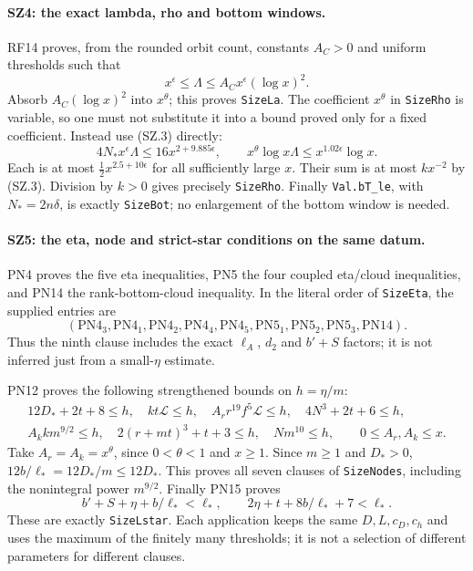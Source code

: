 \documentclass[11pt,a4paper]{article}
\numberwithin{equation}{section}
\theoremstyle{remark}\newtheorem{remark}[theorem]{Remark}
\begin{document}
\paragraph{SZ4: the exact lambda, rho and bottom windows.}
RF14 proves, from the rounded orbit count, constants $A_C>0$ and
uniform thresholds such that
\[
        x^\epsilon\leq\Lambda
                    \leq A_Cx^\epsilon(\log x)^2.
\]
Absorb $A_C(\log x)^2$ into $x^\theta$; this proves
\texttt{SizeLa}. The coefficient $x^\theta$ in
\texttt{SizeRho} is variable, so one must not substitute it into a
bound proved only for a fixed coefficient. Instead use (SZ.3) directly:
\[
 4N_*x^\epsilon\Lambda
       \leq16x^{2+9.885\epsilon},\qquad
 x^\theta\log x\Lambda
       \leq x^{1.02\epsilon}\log x.                            \tag{SZ.9}
\]
Each is at most $\frac12x^{2.5+10\epsilon}$ for all sufficiently
large $x$. Their sum is at most $k x^{-2}$ by (SZ.3).
Division by $k>0$ gives precisely \texttt{SizeRho}.
Finally \texttt{Val.bT\_\allowbreak le}, with $N_*=2n\delta$, is exactly
\texttt{SizeBot}; no enlargement of the bottom window is needed.

\paragraph{SZ5: the eta, node and strict-star conditions on the same datum.}
PN4 proves the five eta inequalities, PN5 the four coupled eta/cloud
inequalities, and PN14 the rank-bottom-cloud inequality. In the
literal order of \texttt{SizeEta}, the supplied entries are
\[
 (\mathrm{PN4}_3,\mathrm{PN4}_1,\mathrm{PN4}_2,
   \mathrm{PN4}_4,\mathrm{PN4}_5,
   \mathrm{PN5}_1,\mathrm{PN5}_2,\mathrm{PN5}_3,\mathrm{PN14}).
                                                                    \tag{SZ.10}
\]
Thus the ninth clause includes the exact $\ell_A$, $d_2$ and
$b'+S$ factors; it is not inferred just from a small-$\eta$ estimate.

PN12 proves the following strengthened bounds on $h=\eta/m$:
\[
 \begin{gathered}
 12D_*+2t+8\leq h,\quad kt\mathcal L\leq h,\quad
 A_r r^{19}f^5\mathcal L\leq h,\quad
 4N^3+2t+6\leq h,\\
 A_k k m^{9/2}\leq h,\quad
 2(r+mt)^3+t+3\leq h,\quad Nm^{10}\leq h,
 \qquad 0\leq A_r,A_k\leq x.
 \end{gathered}                                                    \tag{SZ.11}
\]
Take $A_r=A_k=x^\theta$, since $0<\theta<1$ and $x\geq1$.
Since $m\geq1$ and $D_*>0$,
$12b/\ell_*=12D_*/m\leq12D_*$. This proves all seven
clauses of \texttt{SizeNodes}, including the nonintegral power
$m^{9/2}$. Finally PN15 proves
\[
 b'+S+\eta+b/\ell_*<\ell_*,\qquad
                2\eta+t+8b/\ell_*+7<\ell_*.
\]
These are exactly \texttt{SizeLstar}. Each application keeps the
same $D,L,c_D,c_h$ and uses the maximum of the finitely many
thresholds; it is not a selection of different parameters for different
clauses.
\end{document}
